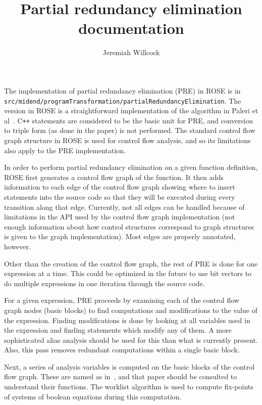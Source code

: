 \documentclass{article}
\begin{document}
\author{Jeremiah Willcock}
\title{Partial redundancy elimination documentation}
\maketitle

\newcommand{\Cpp}{C\texttt{++}}

The implementation of partial redundancy elimination (PRE) in ROSE is in
\texttt{src/midend/programTransformation/partialRedundancyElimination}.
The version in ROSE is a straightforward implementation of the algorithm in
Paleri et al~\cite{paleri}.  \Cpp{} statements are considered to be the
basic unit for PRE, and conversion to triple form (as done in the paper) is
not performed.  The standard control flow graph structure in ROSE is used
for control flow analysis, and so its limitations also apply to the PRE
implementation.

In order to perform partial redundancy elimination on a
given function definition, ROSE first generates a control flow graph of the
function.  It then adds information to each edge of the control flow graph
showing where to insert statements into the source code so that they will
be executed during every transition along that edge.  Currently, not all
edges can be handled because of limitations in the API used by the control
flow graph implementation (not enough information about how control
structures correspond to graph structures is given to the graph
implementation).  Most edges are properly annotated, however.

Other than the creation of the control flow graph, the rest of PRE is done
for one expression at a time.  This could be optimized in the future to use
bit vectors to do multiple expressions in one iteration through the source
code.

For a given expression, PRE proceeds by examining each of the control flow
graph nodes (basic blocks) to find computations and modifications to the
value of the expression.  Finding modifications is done by looking at all
variables used in the expression and finding statements which modify any of
them.  A more sophisticated alias analysis should be used for this than
what is currently present.  Also, this pass removes redundant computations
within a single basic block.

Next, a series of analysis variables is computed on the basic blocks of the
control flow graph.  These are named as in~\cite{paleri}, and that paper
should be consulted to understand their functions.  The worklist algorithm
is used to compute fix-points of systems of boolean equations during this
computation.
\end{document}
